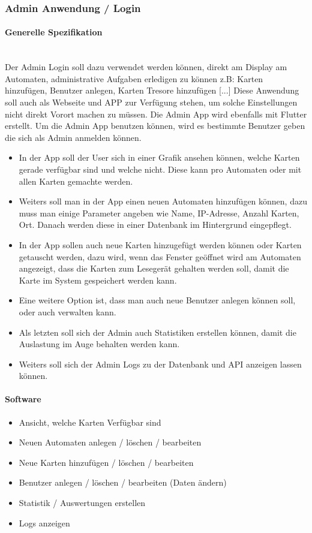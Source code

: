 \documentclass[a4paper]{article}
\begin{document}
\subsubsection{Admin Anwendung / Login}
\paragraph{Generelle Spezifikation}\mbox{}\\
Der Admin Login soll dazu verwendet werden können, direkt am Display am Automaten, administrative Aufgaben erledigen zu können z.B: Karten hinzufügen, Benutzer anlegen, Karten Tresore hinzufügen [...] Diese Anwendung soll auch als Webseite und APP zur Verfügung stehen, um solche Einstellungen nicht direkt Vorort machen zu müssen. Die Admin App wird ebenfalls mit Flutter erstellt. Um die Admin App benutzen können, wird es bestimmte Benutzer geben die sich als Admin anmelden können. 

\begin{itemize}
  \item In der App soll der User sich in einer Grafik ansehen können, welche Karten gerade verfügbar sind und welche nicht. Diese kann pro Automaten oder mit allen Karten gemachte werden. 
  \item Weiters soll man in der App einen neuen Automaten hinzufügen können, dazu muss man einige Parameter angeben wie Name, IP-Adresse, Anzahl Karten, Ort. Danach werden diese in einer Datenbank im Hintergrund eingepflegt. 
  \item In der App sollen auch neue Karten hinzugefügt werden können oder Karten getauscht werden, dazu wird, wenn das Fenster geöffnet wird am Automaten angezeigt, dass die Karten zum Lesegerät gehalten werden soll, damit die Karte im System gespeichert werden kann.
  \item Eine weitere Option ist, dass man auch neue Benutzer anlegen können soll, oder auch verwalten kann.
  \item Als letzten soll sich der Admin auch Statistiken erstellen können, damit die Auslastung im Auge behalten werden kann.
  \item Weiters soll sich der Admin Logs zu der Datenbank und API anzeigen lassen können.
\end{itemize}

\paragraph{Software}
\begin{itemize}
 \item Ansicht, welche Karten Verfügbar sind
 \item Neuen Automaten anlegen / löschen / bearbeiten 
 \item Neue Karten hinzufügen / löschen / bearbeiten
 \item Benutzer anlegen / löschen / bearbeiten (Daten ändern)
 \item Statistik / Auswertungen erstellen
 \item Logs anzeigen
\end{itemize}
\end{document}
